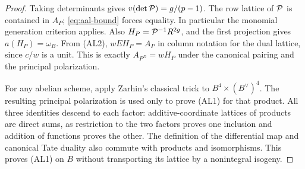 \begin{proof}
Taking determinants gives \(v(\det{\cal P})=g/(p-1)\).
The row lattice of \({\cal P}\) is contained in \(A_P\);
\eqref{eq:aal-bound} forces equality. In particular the
monomial generation criterion applies. Also
\(H_P={\cal P}^{-1}R^{2g}\), and the first projection gives
\(a(H_P)=\omega_B\). From (AL2), \(wEH_P=A_P\)
in column notation for the dual lattice, since \(c/w\)
is a unit. This is exactly \(A_{P^D}=wH_P\) under the
canonical pairing and the principal polarization.

For any abelian scheme, apply Zarhin's classical trick to
\(B^4\times(B^\vee)^4\). The resulting principal polarization
is used only to prove (AL1) for that product. All three
identities descend to each factor: additive-coordinate
lattices of products are direct sums, as restriction to the
two factors proves one inclusion and addition of functions
proves the other. The definition of the differential map
and canonical Tate duality also commute with products and
isomorphisms. This proves (AL1) on \(B\) without transporting
its lattice by a nonintegral isogeny.
\end{proof}

